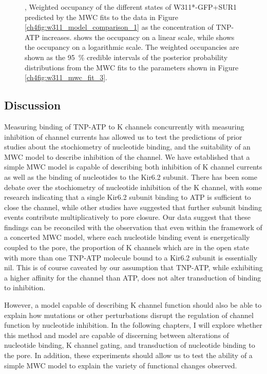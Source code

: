 \begin{figure}[hbtp]
\begin{subfigure}[t]{0.45\textwidth}
	\end{subfigure}
	\caption[Comparing the states and weights of concerted and independent models]{
	{\bf{}}
	,  Weighted occupancy of the different states of W311*-GFP+SUR1 predicted by the MWC fits to the data in Figure \ref{ch4fig:w311_model_comparison_1} as the concentration of TNP-ATP increases.
	 shows the occupancy on a linear scale, while  shows the occupancy on a logarithmic scale.
	The weighted occupancies are shown as the \SI{95}{\percent} credible intervals of the posterior probability distributions from the MWC fits to the parameters shown in Figure \ref{ch4fig:w311_mwc_fit_3}.
	}\label{ch4fig:w311_model_comparison_2}
\end{figure}

\subsection{Discussion}

Measuring binding of TNP-ATP to K\ATP{} channels concurrently with measuring inhibition of channel currents has allowed us to test the predictions of prior studies about the stochiometry of nucleotide binding, and the suitability of an MWC model to describe inhibition of the channel.
We have established that a simple MWC model is capable of describing both inhibition of K\ATP{} channel currents as well as the binding of nucleotides to the Kir6.2 subunit.
There has been some debate over the stochiometry of nucleotide inhibition of the K\ATP{} channel, with some research indicating that a single Kir6.2 subunit binding to ATP is sufficient to close the channel, while other studies have suggested that further subunit binding events contribute multiplicatively to pore closure.
Our data suggest that these findings can be reconciled with the observation that even within the framework of a concerted MWC model, where each nucleotide binding event is energetically coupled to the pore, the proportion of K\ATP{} channels which are in the open state with more than one TNP-ATP molecule bound to a Kir6.2 subunit is essentially nil.
This is of course caveated by our assumption that TNP-ATP, while exhibiting a higher affinity for the channel than ATP, does not alter transduction of binding to inhibition.

However, a model capable of describing K\ATP{} channel function should also be able to explain how mutations or other perturbations disrupt the regulation of channel function by nucleotide inhibition.
In the following chapters, I will explore whether this method and model are capable of discerning between alterations of nucleotide binding, K\ATP{} channel gating, and transduction of nucleotide binding to the pore.
In addition, these experiments should allow us to test the ability of a simple MWC model to explain the variety of functional changes observed.
